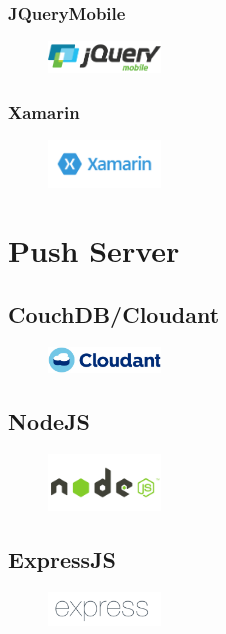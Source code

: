 \subsubsection{JQueryMobile}
\begin{figure}
\includegraphics[width=3cm]{img/mobile-app/logos/jquery-mobile.png}
\end{figure} 

\subsubsection{Xamarin}
\begin{figure}
\includegraphics[width=3cm]{img/mobile-app/logos/xamarin.png}
\end{figure} 

  \section{Push Server}

\subsection{CouchDB/Cloudant}
\begin{figure}
\includegraphics[width=3cm]{img/mobile-app/logos/cloudant.jpg}
\end{figure} 

\subsection{NodeJS}
\begin{figure}
\includegraphics[width=3cm]{img/mobile-app/logos/nodejs.png}
\end{figure} 

\subsection{ExpressJS}
\begin{figure}
\includegraphics[width=3cm]{img/mobile-app/logos/express.png}
\end{figure} 



